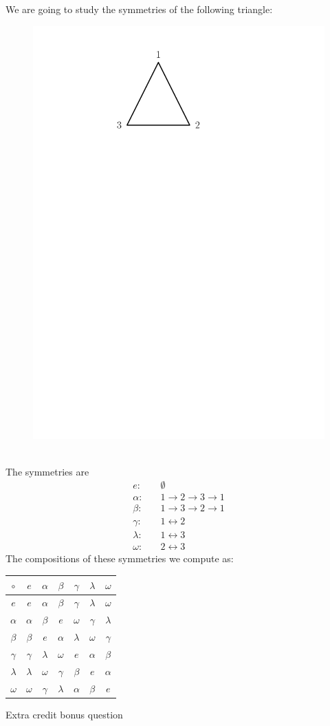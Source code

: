\documentclass{article}
\begin{document}
    We are going to study the symmetries of the following triangle:
    \begin{figure}[ht]
        \centering
        \includegraphics[width=0.25\linewidth]{triangle (1).pdf}
    \end{figure}\\
    The symmetries are
    \begin{align*}
        e:& \quad \emptyset\\
        \alpha: & \quad 1 \rightarrow 2 \rightarrow 3 \rightarrow 1\\
        \beta: & \quad 1 \rightarrow 3 \rightarrow 2 \rightarrow 1\\
        \gamma: & \quad 1 \leftrightarrow 2\\
        \lambda: & \quad 1 \leftrightarrow 3\\
        \omega: & \quad 2 \leftrightarrow 3
    \end{align*}
    The compositions of these symmetries we compute as:
    \begin{table}[ht]
        \centering
        \begin{tabular}{c|cccccc}
            $\circ$ & $e$ & $\alpha$ & $\beta$ & $\gamma$ & $\lambda$ & $\omega$\\
            \hline
            $e$ & $e$ & $\alpha$ & $\beta$ & $\gamma$ & $\lambda$ & $\omega$\\
            $\alpha$ & $\alpha$ & $\beta$ & $e$ & $\omega$ & $\gamma$ & $\lambda$\\
            $\beta$ & $\beta$ & $e$ & $\alpha$ & $\lambda$ & $\omega$ & $\gamma$\\
            $\gamma$ & $\gamma$ & $\lambda$ & $\omega$ & $e$ & $\alpha$ & $\beta$\\
            $\lambda$ & $\lambda$ & $\omega$ & $\gamma$ & $\beta$ & $e$ & $\alpha$\\
            $\omega$ & $\omega$ & $\gamma$ & $\lambda$ & $\alpha$ & $\beta$ & $e$
        \end{tabular}
    \end{table}
    
    \pagebreak
    \begin{center}
        {\Huge \color{red} Extra} {\Large \color{green} credit} {\color{blue} bonus} {\small \color{yellow} question}
    \end{center}
\end{document}
